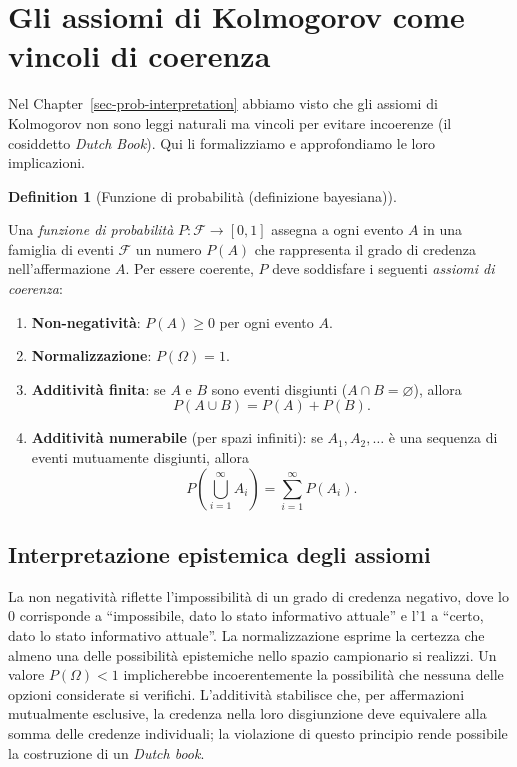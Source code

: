 \documentclass[
  letterpaper,
  DIV=11,
  numbers=noendperiod,
  oneside]{scrreprt}
\theoremstyle{definition}
\theoremstyle{plain}
\theoremstyle{definition}
\newtheorem{definition}{Definition}[chapter]
\theoremstyle{remark}
\begin{document}
\section{Gli assiomi di Kolmogorov come vincoli di
coerenza}\label{gli-assiomi-di-kolmogorov-come-vincoli-di-coerenza}

Nel Chapter~\ref{sec-prob-interpretation} abbiamo visto che gli assiomi
di Kolmogorov non sono leggi naturali ma vincoli per evitare incoerenze
(il cosiddetto \emph{Dutch Book}). Qui li formalizziamo e approfondiamo
le loro implicazioni.

\begin{definition}[Funzione di probabilità (definizione
bayesiana)]\protect\hypertarget{def-probability-measure}{}\label{def-probability-measure}

Una \emph{funzione di probabilità} \(P: \mathcal{F} \to [0,1]\) assegna
a ogni evento \(A\) in una famiglia di eventi \(\mathcal{F}\) un numero
\(P(A)\) che rappresenta il grado di credenza nell'affermazione \(A\).
Per essere coerente, \(P\) deve soddisfare i seguenti \emph{assiomi di
coerenza}:

\begin{enumerate}
\def\labelenumi{\arabic{enumi}.}
\item
  \textbf{Non-negatività}: \(P(A) \geq 0\) per ogni evento \(A\).
\item
  \textbf{Normalizzazione}: \(P(\Omega) = 1\).
\item
  \textbf{Additività finita}: se \(A\) e \(B\) sono eventi disgiunti
  (\(A \cap B = \varnothing\)), allora \[P(A \cup B) = P(A) + P(B).\]
\item
  \textbf{Additività numerabile} (per spazi infiniti): se
  \(A_1, A_2, \ldots\) è una sequenza di eventi mutuamente disgiunti,
  allora
  \[P\left(\bigcup_{i=1}^{\infty} A_i\right) = \sum_{i=1}^{\infty} P(A_i).\]
\end{enumerate}

\end{definition}

\subsection{Interpretazione epistemica degli
assiomi}\label{interpretazione-epistemica-degli-assiomi}

La non negatività riflette l'impossibilità di un grado di credenza
negativo, dove lo 0 corrisponde a ``impossibile, dato lo stato
informativo attuale'' e l'1 a ``certo, dato lo stato informativo
attuale''. La normalizzazione esprime la certezza che almeno una delle
possibilità epistemiche nello spazio campionario si realizzi. Un valore
\(P(\Omega) < 1\) implicherebbe incoerentemente la possibilità che
nessuna delle opzioni considerate si verifichi. L'additività stabilisce
che, per affermazioni mutualmente esclusive, la credenza nella loro
disgiunzione deve equivalere alla somma delle credenze individuali; la
violazione di questo principio rende possibile la costruzione di un
\emph{Dutch book}.
\end{document}
